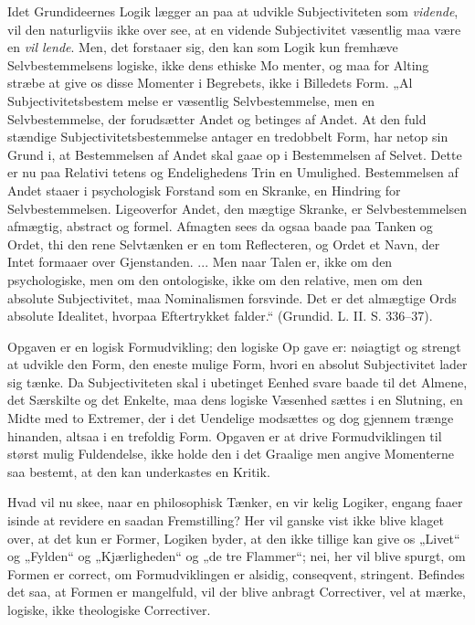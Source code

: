 \documentclass[12pt]{book}
\newcommand{\opage}[1]{\marginnote{\footnotesize\textit{[#1]}}}
\begin{document}
Idet Grundideernes Logik lægger an paa at udvikle
Subjectiviteten som \emph{vidende}, vil den naturligviis ikke over\-%
\opage{128}\setcounter{footnote}{0}%
see, at en vidende Subjectivitet væsentlig maa være en \emph{vil\-%
lende}. Men, det forstaaer sig, den kan som Logik kun
fremhæve Selvbestemmelsens logiske, ikke dens ethiske Mo\-%
menter, og maa for Alting stræbe at give os disse Momenter
i Begrebets, ikke i Billedets Form. „Al Subjectivitetsbestem\-%
melse er væsentlig Selvbestemmelse, men en Selvbestemmelse,
der forudsætter Andet og betinges af Andet. At den fuld\-%
stændige Subjectivitetsbestemmelse antager en tredobbelt Form,
har netop sin Grund i, at Bestemmelsen af Andet skal gaae
op i Bestemmelsen af Selvet. Dette er nu paa Relativi\-%
tetens og Endelighedens Trin en Umulighed. Bestemmelsen
af Andet staaer i psychologisk Forstand som en Skranke, en
Hindring for Selvbestemmelsen. Ligeoverfor Andet, den mægtige
Skranke, er Selvbestemmelsen afmægtig, abstract og formel.
Afmagten sees da ogsaa baade paa Tanken og Ordet, thi
den rene Selvtænken er en tom Reflecteren, og Ordet et
Navn, der Intet formaaer over Gjenstanden. ... Men naar
Talen er, ikke om den psychologiske, men om den ontologiske,
ikke om den relative, men om den absolute Subjectivitet,
maa Nominalismen forsvinde. Det er det almægtige Ords
absolute Idealitet, hvorpaa Eftertrykket falder.“ (Grundid.
L. II. S. 336--37).

Opgaven er en logisk Formudvikling; den logiske Op\-%
gave er: nøiagtigt og strengt at udvikle den Form, den
eneste mulige Form, hvori en absolut Subjectivitet lader sig
tænke. Da Subjectiviteten skal i ubetinget Eenhed svare
baade til det Almene, det Særskilte og det Enkelte, maa dens
logiske Væsenhed sættes i en Slutning, en Midte med to
Extremer, der i det Uendelige modsættes og dog gjennem\-%
trænge hinanden, altsaa i en trefoldig Form. Opgaven er at
drive Formudviklingen til størst mulig Fuldendelse, ikke holde
den i det Graalige men angive Momenterne saa bestemt, at
den kan underkastes en Kritik.

Hvad vil nu skee, naar en philosophisk Tænker, en vir\-%
\opage{129}\setcounter{footnote}{0}%
kelig Logiker, engang faaer isinde at revidere en saadan
Fremstilling? Her vil ganske vist ikke blive klaget over, at
det kun er Former, Logiken byder, at den ikke tillige kan
give os „Livet“ og „Fylden“ og „Kjærligheden“ og „de tre
Flammer“; nei, her vil blive spurgt, om Formen er correct,
om Formudviklingen er alsidig, conseqvent, stringent. Befindes
det saa, at Formen er mangelfuld, vil der blive anbragt
Correctiver, vel at mærke, logiske, ikke theologiske Correctiver.
\end{document}
